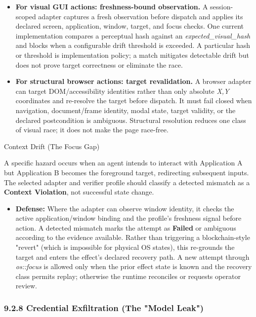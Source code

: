 \documentclass[
  11pt,
]{article}
\providecommand{\tightlist}{%
  \setlength{\itemsep}{0pt}\setlength{\parskip}{0pt}}
\begin{document}
\begin{itemize}
\tightlist
\item
  \textbf{For visual GUI actions: freshness-bound observation.} A
  session-scoped adapter captures a fresh observation before dispatch and
  applies its declared screen, application, window, target, and focus checks.
  One current implementation compares a perceptual hash against an
  \emph{expected\_visual\_hash} and blocks when a configurable drift threshold
  is exceeded. A particular hash or threshold is implementation policy; a
  match mitigates detectable drift but does not prove target correctness or
  eliminate the race.
\item
  \textbf{For structural browser actions: target revalidation.} A browser
  adapter can target DOM/accessibility identities rather than only absolute
  \emph{X,Y} coordinates and re-resolve the target before dispatch. It must
  fail closed when navigation, document/frame identity, modal state, target
  validity, or the declared postcondition is ambiguous. Structural resolution
  reduces one class of visual race; it does not make the page race-free.
\end{itemize}

Context Drift (The Focus Gap)

A specific hazard occurs when an agent intends to interact with
Application A but Application B becomes the foreground target, redirecting
subsequent inputs. The selected adapter and verifier profile should classify a
detected mismatch as a \textbf{Context Violation}, not successful state change.

\begin{itemize}
\tightlist
\item
  \textbf{Defense:} Where the adapter can observe window identity, it checks
  the active application/window binding and the profile's freshness signal
  before action. A detected mismatch marks the attempt as \textbf{Failed} or
  ambiguous according to the evidence available. Rather than triggering a
  blockchain-style "revert" (which is impossible for physical OS
  states), this re-grounds the target and enters the effect's declared
  recovery path. A new attempt through \emph{os::focus} is allowed only when
  the prior effect state is known and the recovery class permits replay;
  otherwise the runtime reconciles or requests operator review.
\end{itemize}

\hypertarget{credential-exfiltration-the-model-leak}{%
\subsubsection{9.2.8 Credential Exfiltration (The "Model
Leak")}\label{credential-exfiltration-the-model-leak}}
\end{document}
